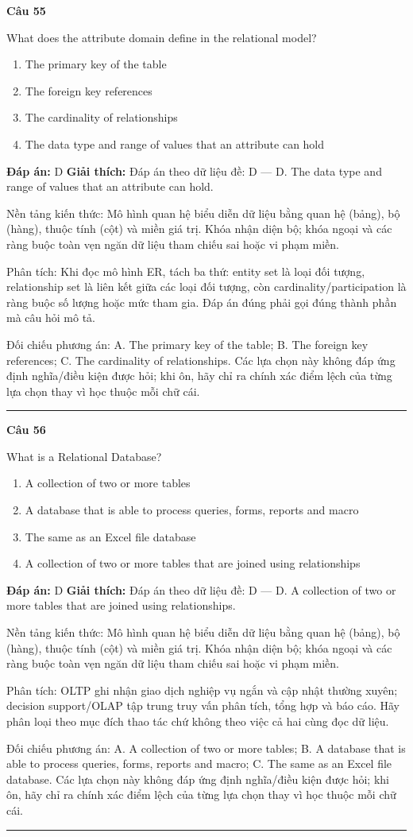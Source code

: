\documentclass[11pt,a4paper]{article}
\newenvironment{question}[1]{%
  \par\vspace{1em}\noindent\textbf{\large Câu #1}\par\vspace{0.4em}
}{%
  \par\vspace{1em}\hrule\vspace{0.6em}
}
\newenvironment{choices}{%
  \begin{enumerate}[label=\textbf{\Alph*.},leftmargin=2.2em,itemsep=2pt,topsep=3pt]
}{%
  \end{enumerate}
}
\newcommand{\choice}{\item}
\begin{document}
\begin{question}{55}
What does the attribute domain define in the relational model?
\begin{choices}
\choice The primary key of the table
\choice The foreign key references
\choice The cardinality of relationships
\choice The data type and range of values that an attribute can hold
\end{choices}
\textbf{Đáp án:} D
\textbf{Giải thích:} Đáp án theo dữ liệu đề: D — D. The data type and range of values that an attribute can hold.

Nền tảng kiến thức: Mô hình quan hệ biểu diễn dữ liệu bằng quan hệ (bảng), bộ (hàng), thuộc tính (cột) và miền giá trị. Khóa nhận diện bộ; khóa ngoại và các ràng buộc toàn vẹn ngăn dữ liệu tham chiếu sai hoặc vi phạm miền.

Phân tích: Khi đọc mô hình ER, tách ba thứ: entity set là loại đối tượng, relationship set là liên kết giữa các loại đối tượng, còn cardinality/participation là ràng buộc số lượng hoặc mức tham gia. Đáp án đúng phải gọi đúng thành phần mà câu hỏi mô tả.

Đối chiếu phương án: A. The primary key of the table; B. The foreign key references; C. The cardinality of relationships. Các lựa chọn này không đáp ứng định nghĩa/điều kiện được hỏi; khi ôn, hãy chỉ ra chính xác điểm lệch của từng lựa chọn thay vì học thuộc mỗi chữ cái.
\end{question}

\begin{question}{56}
What is a Relational Database?
\begin{choices}
\choice A collection of two or more tables
\choice A database that is able to process queries, forms, reports and macro
\choice The same as an Excel file database
\choice A collection of two or more tables that are joined using relationships
\end{choices}
\textbf{Đáp án:} D
\textbf{Giải thích:} Đáp án theo dữ liệu đề: D — D. A collection of two or more tables that are joined using relationships.

Nền tảng kiến thức: Mô hình quan hệ biểu diễn dữ liệu bằng quan hệ (bảng), bộ (hàng), thuộc tính (cột) và miền giá trị. Khóa nhận diện bộ; khóa ngoại và các ràng buộc toàn vẹn ngăn dữ liệu tham chiếu sai hoặc vi phạm miền.

Phân tích: OLTP ghi nhận giao dịch nghiệp vụ ngắn và cập nhật thường xuyên; decision support/OLAP tập trung truy vấn phân tích, tổng hợp và báo cáo. Hãy phân loại theo mục đích thao tác chứ không theo việc cả hai cùng đọc dữ liệu.

Đối chiếu phương án: A. A collection of two or more tables; B. A database that is able to process queries, forms, reports and macro; C. The same as an Excel file database. Các lựa chọn này không đáp ứng định nghĩa/điều kiện được hỏi; khi ôn, hãy chỉ ra chính xác điểm lệch của từng lựa chọn thay vì học thuộc mỗi chữ cái.
\end{question}
\end{document}
